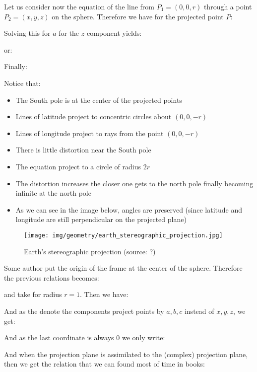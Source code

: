 	Let us consider now the equation of the line from $P_1=(0,0,r)$ through a point $P_2=(x,y,z)$ on the sphere. Therefore we have for the projected point $P$:
	
	Solving this for $a$ for the $z$ component yields:
	
	or:
	
	Finally:
	
	Notice that:
	\begin{itemize}
		\item The South pole is at the center of the projected points

		\item Lines of latitude project to concentric circles about $(0,0,-r)$

		\item Lines of longitude project to rays from the point $(0,0,-r)$

		\item There is little distortion near the South pole

		\item The equation project to a circle of radius $2r$

		\item The distortion increases the closer one gets to the north pole finally becoming infinite at the north pole
		
		\item As we can see in the image below, angles are preserved (since latitude and longitude are still perpendicular on the projected plane)
	\end{itemize}
	\begin{figure}[H]
		\centering
		\texttt{[image: img/geometry/earth\_stereographic\_projection.jpg]}
		\caption{Earth's stereographic projection (source: ?)}
	\end{figure}
	Some author put the origin of the frame at the center of the sphere. Therefore the previous relations becomes:
	
	and take for radius $r=1$. Then we have:
	
	And as the denote the components project points by $a,b,c$ instead of $x,y,z$, we get:
	
	And as the last coordinate is always $0$ we only write:
	
	And when the projection plane is assimilated to the (complex) projection plane, then we get the relation that we can found most of time in books:
	
